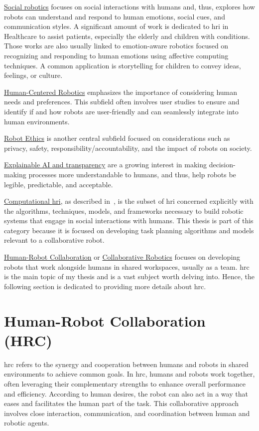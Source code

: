 \uline{Social robotics} focuses on social interactions with humans and, thus, explores how robots can understand and respond to human emotions, social cues, and communication styles.
A significant amount of work is dedicated to \acrshort{hri} in Healthcare to assist patients, especially the elderly and children with conditions. Those works are also usually linked to emotion-aware robotics focused on recognizing and responding to human emotions using affective computing techniques. A common application is storytelling for children to convey ideas, feelings, or culture. 

\uline{Human-Centered Robotics} emphasizes the importance of considering human needs and preferences. This subfield often involves user studies to ensure and identify if and how robots are user-friendly and can seamlessly integrate into human environments.

\uline{Robot Ethics} is another central subfield focused on considerations such as privacy, safety, responsibility/accountability, and the impact of robots on society.

\uline{Explainable AI and transparency} are a growing interest in making decision-making processes more understandable to humans, and thus, help robots be legible, predictable, and acceptable.

\uline{Computational \acrshort{hri}}, as described in~\cite{thomaz_computational_2016}, is the subset of \acrshort{hri} concerned explicitly with the algorithms, techniques, models, and frameworks necessary to build robotic systems that engage in social interactions with humans. This thesis is part of this category because it is focused on developing task planning algorithms and models relevant to a collaborative robot. 

\uline{Human-Robot Collaboration} or \uline{Collaborative Robotics} focuses on developing robots that work alongside humans in shared workspaces, usually as a team. \acrshort{hrc} is the main topic of my thesis and is a vast subject worth delving into. Hence, the following section is dedicated to providing more details about \acrshort{hrc}.

\section{Human-Robot Collaboration (HRC)}

\acrfull{hrc} refers to the synergy and cooperation between humans and robots in shared environments to achieve common goals. In \acrshort{hrc}, humans and robots work together, often leveraging their complementary strengths to enhance overall performance and efficiency. According to human desires, the robot can also act in a way that eases and facilitates the human part of the task. This collaborative approach involves close interaction, communication, and coordination between human and robotic agents.

